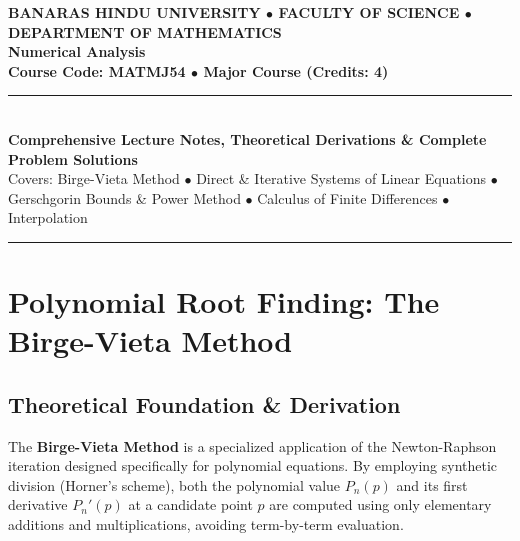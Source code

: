 \documentclass[11pt,a4paper]{article}
\begin{document}
\begin{center}
    {\small\bfseries\color{accent} BANARAS HINDU UNIVERSITY $\bullet$ FACULTY OF SCIENCE $\bullet$ DEPARTMENT OF MATHEMATICS}\\[4pt]
    {\huge\bfseries\color{primary} Numerical Analysis}\\[4pt]
    {\large\bfseries\color{secondary} Course Code: MATMJ54 $\bullet$ Major Course (Credits: 4)}\\[8pt]
    \rule{0.6\textwidth}{1.5pt}\\[10pt]
    {\large\bfseries Comprehensive Lecture Notes, Theoretical Derivations \& Complete Problem Solutions}\\[4pt]
    {\small\color{subtle} Covers: Birge-Vieta Method $\bullet$ Direct \& Iterative Systems of Linear Equations $\bullet$ Gerschgorin Bounds \& Power Method $\bullet$ Calculus of Finite Differences $\bullet$ Interpolation}
\end{center}

\vspace{-4pt}
\hrule
\vspace{10pt}

\tableofcontents
\newpage

\section{Polynomial Root Finding: The Birge-Vieta Method}

\subsection{Theoretical Foundation \& Derivation}
The \textbf{Birge-Vieta Method} is a specialized application of the Newton-Raphson iteration designed specifically for polynomial equations. By employing synthetic division (Horner's scheme), both the polynomial value $P_n(p)$ and its first derivative $P_n'(p)$ at a candidate point $p$ are computed using only elementary additions and multiplications, avoiding term-by-term evaluation.
\end{document}
